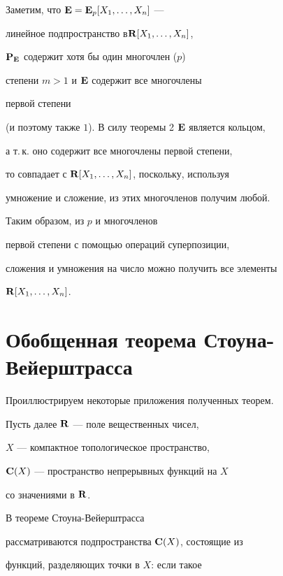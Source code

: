 \begin{pf}


Заметим, что ${\bold E}={\bold E}_p[X_1,\dotsc,X_n]$ ---


линейное подпространство в\linebreak ${\bold R}[X_1,\dotsc,X_n]$,


$\bold P_{\bold E}$ содержит хотя бы один многочлен ($p$)


степени $m>1$ и ${\bold E}$ содержит все многочлены


первой степени


(и поэтому также $1$). В силу теоремы 2\; $\bold E$ является кольцом,


а т.\,к. оно содержит все многочлены первой степени,


то совпадает с ${\bold R}[X_1,\dotsc,X_n]$, поскольку, используя


умножение и сложение, из этих многочленов получим любой.





Таким образом, из $p$ и многочленов


первой степени с помощью операций суперпозиции,


сложения и умножения на число можно получить все элементы


${\bold R}[X_1,\dotsc,X_n]$.


\end{pf}





\section{Обобщенная теорема Стоуна-Вейерштрасса}





Проиллюстрируем некоторые приложения полученных теорем.


Пусть далее ${\bold R}$ --- поле вещественных чисел,


$X$ --- компактное топологическое пространство,


${\bold C}(X)$ --- пространство непрерывных функций на $X$


со значениями в ${\bold R}$.


В теореме Стоуна-Вейерштрасса


рассматриваются подпространства ${\bold C}(X)$, состоящие из


функций, разделяющих точки в $X$: если такое


